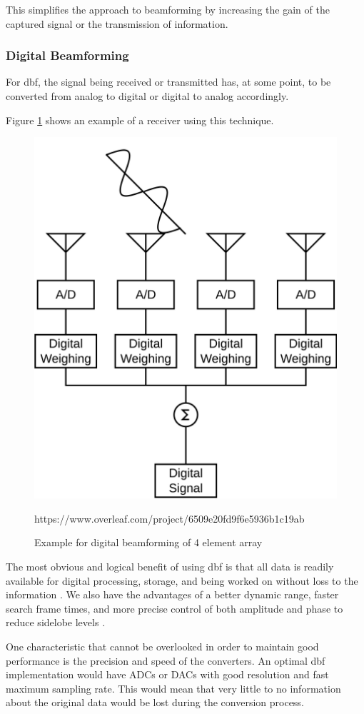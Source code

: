 \par This simplifies the approach to beamforming by increasing the gain of the captured signal or the transmission of information.

\subsubsection{Digital Beamforming}
\par For \ac{dbf}, the signal being received or transmitted has, at some point, to be converted from analog to digital or digital to analog accordingly. 

\par Figure \ref{fig:ch_2_secArray_DigitalBeamforming} shows an example of a receiver using this technique.

\begin{figure}[H]
    \vspace*{0cm}
    \centering
    \includegraphics[width=0.5\linewidth]{figs/ch_2_secArray_DigitalBeamforming.png}
    \caption{Example for digital beamforming of 4 element array}
    \label{fig:ch_2_secArray_DigitalBeamforming}https://www.overleaf.com/project/6509e20fd9f6e5936b1c19ab
\end{figure}

\par The most obvious and logical benefit of using \ac{dbf} is that all data is readily available for digital processing, storage, and being worked on without loss to the information \cite{Kasemir2009WidebandBeamforming}. We also have the advantages of a better dynamic range, faster search frame times, and more precise control of both amplitude and phase to reduce sidelobe levels \cite{Skolnik2008RadarHandbook}.

\par One characteristic that cannot be overlooked in order to maintain good performance is the precision and speed of the converters. An optimal \ac{dbf} implementation would have ADCs or DACs with good resolution and fast maximum sampling rate. This would mean that very little to no information about the original data would be lost during the conversion process.

